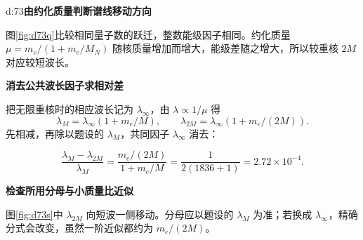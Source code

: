 \begin{drillsolution}{d:73}\textbf{由约化质量判断谱线移动方向}\par\nobreak
图\ref{fig:d73q}比较相同量子数的跃迁，整数能级因子相同。约化质量 $\mu=m_e/(1+m_e/M_N)$ 随核质量增加而增大，能级差随之增大，所以较重核 $2M$ 对应较短波长。



\par\medskip{}\noindent\textbf{消去公共波长因子求相对差}\par\nobreak
把无限重核时的相应波长记为 $\lambda_\infty$，由 $\lambda\propto1/\mu$ 得
\[
 \lambda_M=\lambda_\infty(1+m_e/M),\qquad
 \lambda_{2M}=\lambda_\infty(1+m_e/(2M)).
\]
先相减，再除以题设的 $\lambda_M$，共同因子 $\lambda_\infty$ 消去：

\[
 \frac{\lambda_M-\lambda_{2M}}{\lambda_M}
 =\frac{m_e/(2M)}{1+m_e/M}
 =\boxed{\frac1{2(1836+1)}=2.72\times10^{-4}}.
\]


\par\medskip{}\noindent\textbf{检查所用分母与小质量比近似}\par\nobreak
图\ref{fig:d73s}中 \(\lambda_{2M}\) 向短波一侧移动。分母应以题设的 \(\lambda_M\) 为准；若换成 \(\lambda_\infty\)，精确分式会改变，虽然一阶近似都约为 \(m_e/(2M)\)。
\end{drillsolution}

